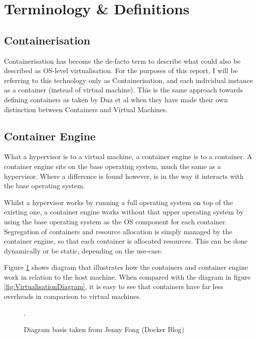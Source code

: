 \section{Terminology \& Definitions}

\subsection{Containerisation}
\label{sec:containerisation}
Containerisation has become the de-facto term to describe what could also be described as OS-level virtualisation. For the purposes of this report, I will be referring to this technology only as Containerisation, and each individual instance as a container (instead of virtual machine). This is the same approach towards defining containers as taken by Dua et al \citep{dua14} when they have made their own distinction between Containers and Virtual Machines.

\subsection{Container Engine}
\label{Container Engine}
What a hypervisor is to a virtual machine, a container engine is to a container. A container engine sits on the base operating system, much the same as a hypervisor. Where a difference is found however, is in the way it interacts with the base operating system.

Whilst a hypervisor works by running a full operating system on top of the existing one, a container engine works without that upper operating system by using the base operating system as the OS component for each container. Segregation of containers and resource allocation is simply managed by the container engine, so that each container is allocated resources. This can be done dynamically or be static, depending on the use-case.

Figure \ref{fig:ContainerDiagram} shows diagram that illustrates how the containers and container engine work in relation to the host machine. When compared with the diagram in figure \ref{fig:VirtualisationDiagram}, it is easy to see that containers have far less overheads in comparison to virtual machines.

\begin{figure}[H]
\caption{Diagram basis taken from Jenny Fong (Docker Blog)\citep{ContainerDiagram}}.
\label{fig:ContainerDiagram}
\centering
\end{figure}

